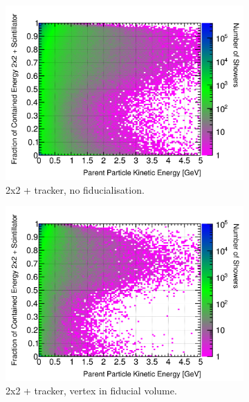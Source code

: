 \documentclass[10pt,a4paper,openany]{article}
\begin{document}
\begin{figure}[htbp]
\begin{subfigure}[b]{0.49\textwidth}
	\end{subfigure}	
	\begin{subfigure}[b]{0.49\textwidth}
		\centering
		\includegraphics[width=1.0\textwidth]{EM_contained_frac_2x2_Scintillator_gap.png}
		\caption{2x2 + tracker, no fiducialisation.}
		\label{}
	\end{subfigure}	
	\hfill
	\begin{subfigure}[b]{0.49\textwidth}
		\centering
		\includegraphics[width=1.0\textwidth]{EM_contained_frac_2x2_Scintillator_fiducial_gap.png}
		\caption{2x2 + tracker, vertex in fiducial volume.}
		\label{}
	\end{subfigure}
	\begin{subfigure}[b]{0.49\textwidth}
		\centering

\end{subfigure}
\end{figure}
\end{document}
